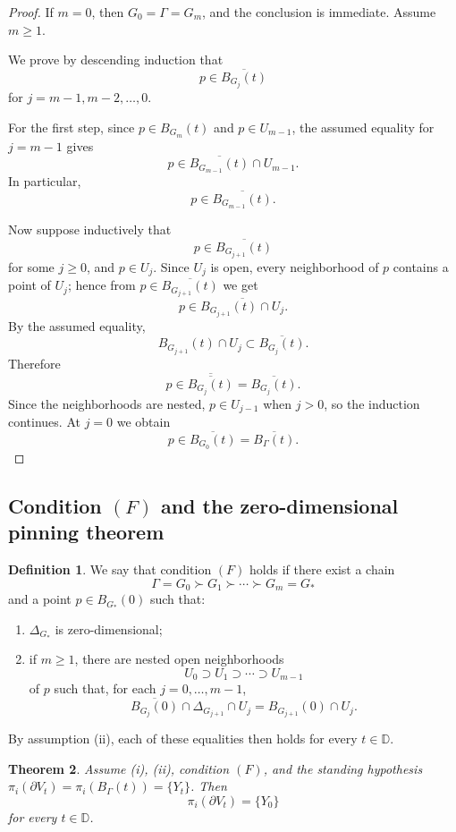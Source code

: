 \documentclass[12pt]{article}
\theoremstyle{plain}
\newtheorem{theorem}{Theorem}[section]
\theoremstyle{definition}
\newtheorem{definition}[theorem]{Definition}
\theoremstyle{remark}
\newcommand{\D}{\mathbb D}
\begin{document}
\begin{proof}
If \(m=0\), then \(G_0=\Gamma=G_m\), and the conclusion is immediate.  Assume \(m\ge 1\).

We prove by descending induction that
\[
p\in \overline{B_{G_j}(t)}
\]
for \(j=m-1,m-2,\dots,0\).

For the first step, since \(p\in B_{G_m}(t)\) and \(p\in U_{m-1}\), the assumed equality for \(j=m-1\) gives
\[
p\in \overline{B_{G_{m-1}}(t)}\cap U_{m-1}.
\]
In particular,
\[
p\in \overline{B_{G_{m-1}}(t)}.
\]

Now suppose inductively that
\[
p\in \overline{B_{G_{j+1}}(t)}
\]
for some \(j\ge 0\), and \(p\in U_j\).  Since \(U_j\) is open, every neighborhood of \(p\) contains a point of \(U_j\); hence from \(p\in \overline{B_{G_{j+1}}(t)}\) we get
\[
p\in \overline{B_{G_{j+1}}(t)\cap U_j}.
\]
By the assumed equality,
\[
B_{G_{j+1}}(t)\cap U_j
\subset
\overline{B_{G_j}(t)}.
\]
Therefore
\[
p\in \overline{\overline{B_{G_j}(t)}}=\overline{B_{G_j}(t)}.
\]
Since the neighborhoods are nested, \(p\in U_{j-1}\) when \(j>0\), so the induction continues.  At \(j=0\) we obtain
\[
p\in \overline{B_{G_0}(t)}=\overline{B_\Gamma(t)}.
\]
\end{proof}

\subsection{Condition \((F)\) and the zero-dimensional pinning theorem}

\begin{definition}\label{def:F}
We say that condition \((F)\) holds if there exist a chain
\[
\Gamma=G_0\succ G_1\succ \cdots \succ G_m=G_*
\]
and a point \(p\in B_{G_*}(0)\) such that:

\begin{enumerate}[label=(\alph*)]
  \item \(\Delta_{G_*}\) is zero-dimensional;
  \item if \(m\ge 1\), there are nested open neighborhoods
  \[
  U_0\supset U_1\supset \cdots \supset U_{m-1}
  \]
  of \(p\) such that, for each \(j=0,\dots,m-1\),
  \[
  \overline{B_{G_j}(0)}\cap \Delta_{G_{j+1}}\cap U_j
  =
  B_{G_{j+1}}(0)\cap U_j.
  \]
\end{enumerate}

By assumption (ii), each of these equalities then holds for every \(t\in\D\).
\end{definition}

\begin{theorem}\label{thm:F}
Assume (i), (ii), condition \((F)\), and the standing hypothesis \(\pi_i(\partial V_t)=\pi_i(B_\Gamma(t))=\{Y_t\}\).  Then
\[
\pi_i(\partial V_t)=\{Y_0\}
\]
for every \(t\in\D\).
\end{theorem}
\end{document}
